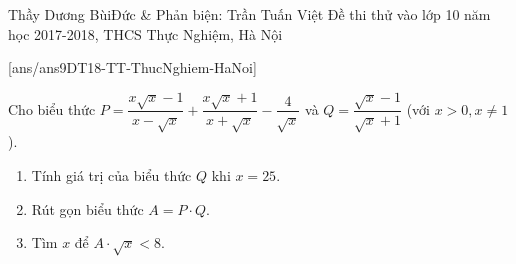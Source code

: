 \begin{name}
{Thầy Dương BùiĐức \& Phản biện: Trần Tuấn Việt}
{Đề thi thử vào lớp 10 năm học 2017-2018, THCS Thực Nghiệm, Hà Nội}
\end{name}
\setcounter{ex}{0}
[ans/ans9DT18-TT-ThucNghiem-HaNoi]
\begin{ex}%
Cho biểu thức $ P=\dfrac{x\sqrt{x}-1}{x-\sqrt{x}}+\dfrac{x\sqrt{x}+1}{x+\sqrt{x}}-\dfrac{4}{\sqrt{x}} $ và $ Q=\dfrac{\sqrt{x}-1}{\sqrt{x}+1} $ (với $ x>0,x\neq 1 $).
\begin{enumerate}
\item Tính giá trị của biểu thức $ Q $ khi $ x=25 $.
\item Rút gọn biểu thức $ A=P\cdot Q $.
\item Tìm $ x $ để $ A\cdot \sqrt{x}<8 $.
\end{enumerate}
\end{ex}
